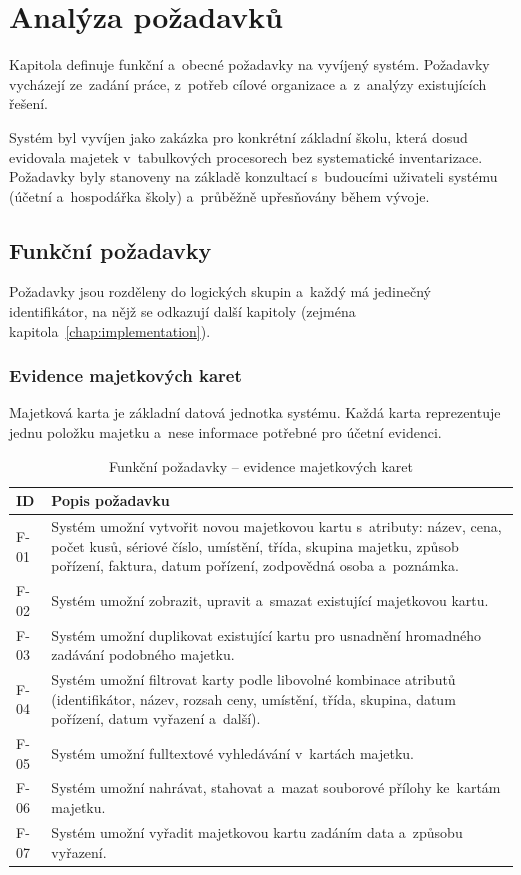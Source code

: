 \chapter{Analýza požadavků}\label{chap:requirements}

\begin{chapterabstract}
	Kapitola definuje funkční a~obecné požadavky na vyvíjený systém. Požadavky vycházejí ze~zadání práce, z~potřeb cílové organizace a~z~analýzy existujících řešení.
\end{chapterabstract}

Systém byl vyvíjen jako zakázka pro konkrétní základní školu, která dosud evidovala majetek v~tabulkových procesorech bez systematické inventarizace. Požadavky byly stanoveny na základě konzultací s~budoucími uživateli systému (účetní a~hospodářka školy) a~průběžně upřesňovány během vývoje.

\section{Funkční požadavky}

Požadavky jsou rozděleny do logických skupin a~každý má jedinečný identifikátor, na nějž se odkazují další kapitoly (zejména kapitola~\ref{chap:implementation}).

\subsection{Evidence majetkových karet}

Majetková karta je základní datová jednotka systému. Každá karta reprezentuje jednu položku majetku a~nese informace potřebné pro účetní evidenci.

\begin{table}[H]\centering
\renewcommand{\arraystretch}{1.4}
\caption{Funkční požadavky -- evidence majetkových karet}\label{tab:freq-cards}
\begin{tabular}{l|p{10cm}}
	\textbf{ID} & \textbf{Popis požadavku} \tabularnewline \hline
	F-01 & Systém umožní vytvořit novou majetkovou kartu s~atributy: název, cena, počet kusů, sériové číslo, umístění, třída, skupina majetku, způsob pořízení, faktura, datum pořízení, zodpovědná osoba a~poznámka. \tabularnewline
	F-02 & Systém umožní zobrazit, upravit a~smazat existující majetkovou kartu. \tabularnewline
	F-03 & Systém umožní duplikovat existující kartu pro usnadnění hromadného zadávání podobného majetku. \tabularnewline
	F-04 & Systém umožní filtrovat karty podle libovolné kombinace atributů (identifikátor, název, rozsah ceny, umístění, třída, skupina, datum pořízení, datum vyřazení a~další). \tabularnewline
	F-05 & Systém umožní fulltextové vyhledávání v~kartách majetku. \tabularnewline
	F-06 & Systém umožní nahrávat, stahovat a~mazat souborové přílohy ke~kartám majetku. \tabularnewline
	F-07 & Systém umožní vyřadit majetkovou kartu zadáním data a~způsobu vyřazení. \tabularnewline
\end{tabular}
\end{table}

